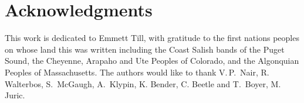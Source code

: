 \documentclass[reprint,%
 amsmath,amssymb,
 aps,
]{revtex4-1}
\begin{document}
 
 
  
  
   

  \section[]{Acknowledgments}
 This work is dedicated to Emmett Till, with   gratitude to the first nations peoples on whose land this was written including   the Coast Salish bands of the Puget Sound, 
 the Cheyenne, Arapaho and Ute  Peoples of Colorado, and the Algonquian Peoples of Massachusetts. 
  The authors would like to thank    V.\,P.\,  Nair,   R.\, Walterbos, S.\ McGaugh,  A.\, Klypin, K. Bender, C. Beetle and     T.\, Boyer, M. Juric.   \\
  
 

 
\end{document}
